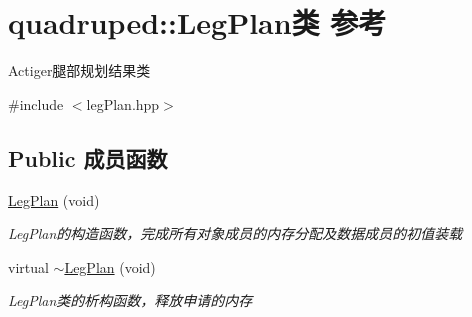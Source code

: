 \hypertarget{classquadruped_1_1LegPlan}{}\section{quadruped\+:\+:Leg\+Plan类 参考}
\label{classquadruped_1_1LegPlan}


Actiger腿部规划结果类  




{\ttfamily \#include $<$leg\+Plan.\+hpp$>$}

\subsection*{Public 成员函数}
\begin{DoxyCompactItemize}
\item 
\mbox{\label{classquadruped_1_1LegPlan_a9ec36b11571572979408c6c5d97c13c5}} 
\hyperlink{classquadruped_1_1LegPlan_a9ec36b11571572979408c6c5d97c13c5}{Leg\+Plan} (void)
\begin{DoxyCompactList}\small\item\em Leg\+Plan的构造函数，完成所有对象成员的内存分配及数据成员的初值装载 \end{DoxyCompactList}\item 
\mbox{\label{classquadruped_1_1LegPlan_a12f579eed696c2bec5c5e647835ba7ca}} 
virtual \hyperlink{classquadruped_1_1LegPlan_a12f579eed696c2bec5c5e647835ba7ca}{$\sim$\+Leg\+Plan} (void)
\begin{DoxyCompactList}\small\item\em Leg\+Plan类的析构函数，释放申请的内存 \end{DoxyCompactList}\end{DoxyCompactItemize}
